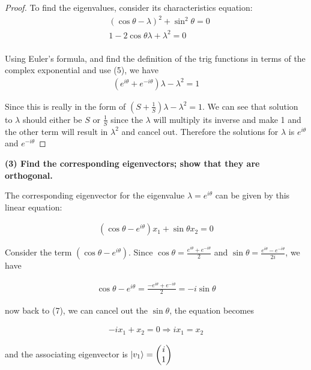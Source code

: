 \documentclass{article}
\begin{document}
\begin{proof}
    To find the eigenvalues, consider its characteristics equation:
    \begin{align}
        &(\cos\theta - \lambda)^2 + \sin^2 \theta = 0 \\
        &1 - 2 \cos \theta \lambda + \lambda^2 = 0 \\
    \end{align}

    Using Euler's formula, and find the definition of the trig functions in terms of the complex exponential and use (5), we have
    \begin{align}
        (e^{i\theta} + e^{-i\theta}) \lambda - \lambda^2 = 1
    \end{align}

    Since this is really in the form of $ (S + \frac{1}{S})\lambda - \lambda^2 = 1$. We can see that solution to $\lambda$ should either be $S$ or $\frac{1}{S}$ since the $\lambda$ will multiply its inverse and make 1 and the other term will result in $\lambda^2$ and cancel out. Therefore the solutions for $\lambda$ is $e^{i\theta}$ and $e^{-i\theta}$
\end{proof}

\textbf{(3) Find the corresponding eigenvectors; show that they are orthogonal.}

The corresponding eigenvector for the eigenvalue $\lambda = e^{i\theta}$ can be given by this linear equation:

\begin{align}
    (\cos \theta - e^{i\theta}) x_1 + \sin \theta x_2 = 0
\end{align}

Consider the term $(\cos \theta - e^{i\theta})$. Since $\cos \theta = \frac{e^{i\theta}+e^{-i\theta}}{2}$ and $\sin \theta = \frac{e^{i\theta}-e^{-i\theta}}{2i}$, we have

\begin{align}
    \cos \theta - e^{i\theta} = \frac{-e^{i\theta} + e^{-i\theta}}{2} = -i \sin \theta 
\end{align}

now back to (7), we can cancel out the $\sin \theta$, the equation becomes

\begin{align}
    -i x_1 + x_2 = 0 \Rightarrow i x_1 = x_2
\end{align}

and the associating eigenvector is $\ket{v_1} = \begin{pmatrix}
    i \\ 1
\end{pmatrix}$
\end{document}
